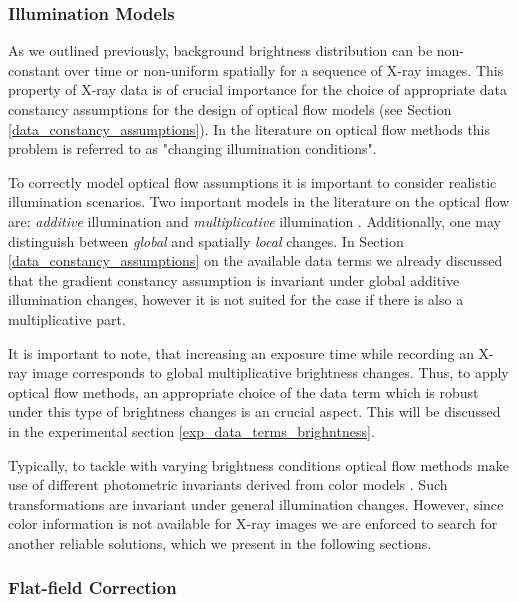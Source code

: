 \subsubsection{Illumination Models}
\label{illumination_models}

As we outlined previously, background brightness distribution can be non-constant over time or non-uniform spatially for a sequence of X-ray images. This property of X-ray data is of crucial importance for the choice of appropriate data constancy assumptions for the design of optical flow models (see Section \ref{data_constancy_assumptions}). In the literature on optical flow methods this problem is referred to as "changing illumination conditions". 

To correctly model optical flow assumptions it is important to consider realistic illumination scenarios. Two important models in the literature on the optical flow are: \textit{additive} illumination and \textit{multiplicative} illumination \cite{Weijer04, Mileva07}. Additionally, one may distinguish between \textit{global} and spatially \textit{local} changes.
In Section \ref{data_constancy_assumptions} on the available data terms  we already discussed that the gradient constancy assumption is invariant under global additive illumination changes, however it is not suited for the case if there is also a multiplicative part.

It is important to note, that increasing an exposure time while recording an X-ray image corresponds to global multiplicative brightness changes. Thus, to apply optical flow methods, an appropriate choice of the data term which is robust under this type of brightness changes is an crucial aspect. This will be discussed in the experimental section \ref{exp_data_terms_brighntness}.

Typically, to tackle with varying brightness conditions optical flow methods make use of different photometric invariants derived from color models \cite{Mileva07, HarmonyFlow}. Such transformations are invariant under general illumination changes.  
However, since color information is not available for X-ray images we are enforced to search for another reliable solutions, which we present in the following sections. 

        

        
\subsubsection{Flat-field Correction}
\label{flat_field_correction}


